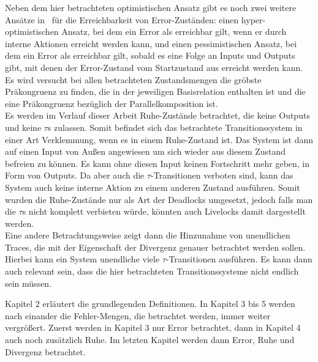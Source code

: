 Neben dem hier betrachteten optimistischen Ansatz gibt es noch zwei weitere
Ansätze in~\cite{Vogler2014EIO} für die Erreichbarkeit von Error-Zuständen:
einen hyper-optimistischen Ansatz, bei dem ein Error als erreichbar gilt, wenn
er durch interne Aktionen erreicht werden kann, und einen pessimistischen
Ansatz, bei dem ein Error als erreichbar gilt, sobald es eine Folge an Inputs
und Outputs gibt, mit denen der Error-Zustand vom Startzustand aus erreicht
werden kann.\\
Es wird versucht bei allen betrachteten Zustandsmengen die gröbste Präkongruenz zu
finden, die in der jeweiligen Basisrelation enthalten ist und die eine
Präkongruenz bezüglich der Parallelkomposition ist.\\
Es werden im Verlauf dieser Arbeit Ruhe-Zustände betrachtet, die keine Outputs
und keine $\tau$s zulassen. Somit befindet sich das betrachtete
Transitionssystem in einer Art Verklemmung, wenn es in einem Ruhe-Zustand ist.
Das System ist dann auf einen Input von Außen angewiesen um sich wieder aus
diesem Zustand befreien zu können. Es kann ohne diesen Input keinen Fortschritt
mehr geben, in Form von Outputs. Da aber auch die $\tau$-Transitionen verboten
sind, kann das System auch keine interne Aktion zu einem anderen Zustand
ausführen. Somit wurden die Ruhe-Zustände nur als Art der Deadlocks umgesetzt,
jedoch falls man die $\tau$s nicht komplett verbieten würde, könnten auch
Livelocks damit dargestellt werden.\\
Eine andere Betrachtungsweise zeigt dann die Hinzunahme von unendlichen Traces,
die mit der Eigenschaft der Divergenz genauer betrachtet werden sollen. Hierbei
kann ein System unendliche viele $\tau$-Transitionen ausführen. Es kann dann
auch relevant sein, dass die hier betrachteten Transitionssysteme nicht endlich sein
müssen.

Kapitel 2 erläutert die grundlegenden Definitionen. In Kapitel 3 bis 5 werden
nach einander die Fehler-Mengen, die betrachtet werden, immer weiter vergrößert.
Zuerst werden in Kapitel 3 nur Error betrachtet, dann in Kapitel 4 auch noch
zusätzlich Ruhe. Im letzten Kapitel werden dann Error, Ruhe und Divergenz
betrachtet.
